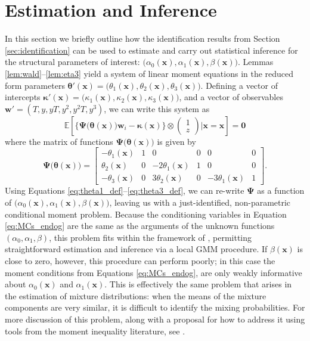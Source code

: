 \section{Estimation and Inference}
\label{sec:inference}
In this section we briefly outline how the identification results from Section \ref{sec:identification} can be used to estimate and carry out statistical inference for the structural parameters of interest: $\big(\alpha_0(\mathbf{x}), \alpha_1(\mathbf{x}), \beta(\mathbf{x})\big)$.
Lemmas \ref{lem:wald}--\ref{lem:eta3} yield a system of linear moment equations in the reduced form parameters $\boldsymbol{\theta}'(\mathbf{x}) = \big(\theta_1(\mathbf{x}), \theta_2(\mathbf{x}),\theta_3(\mathbf{x})\big)$.
Defining a vector of intercepts $\boldsymbol{\kappa}'(\mathbf{x}) = \big(\kappa_1(\mathbf{x}), \kappa_2(\mathbf{x}), \kappa_3(\mathbf{x})\big)$,
and a vector of observables $\mathbf{w}' = (T, y, yT, y^2, y^2 T, y^3)$, we can write this system as
\begin{equation}
\mathbb{E}\left[
  \bigg\{\boldsymbol{\Psi}\big(\boldsymbol{\theta}(\mathbf{x})\big)\mathbf{w}_i - \boldsymbol{\kappa}(\mathbf{x})\bigg\} \otimes 
\left(
\begin{array}{c}
  1 \\ z
\end{array}\right)\Bigg| \mathbf{x} = \boldsymbol{x}
\right] = \mathbf{0}
\label{eq:MCs_endog}
\end{equation}
where the matrix of functions $\boldsymbol{\Psi}\big(\boldsymbol{\theta}(\mathbf{x})\big)$ is given by 
\[
  \boldsymbol{\Psi}\big(\boldsymbol{\theta}(\mathbf{x})\big) = 
  \left[
  \begin{array}{rrrrrr}
    -\theta_1(\mathbf{x}) & 1 & 0 & 0 & 0 & 0\\
    \theta_2(\mathbf{x}) & 0 & -2\theta_1(\mathbf{x}) & 1 & 0 & 0\\ 
    -\theta_3(\mathbf{x}) & 0 & 3\theta_2(\mathbf{x}) & 0 & -3\theta_1(\mathbf{x}) & 1
\end{array}\right].
\]
Using Equations \ref{eq:theta1_def}--\ref{eq:theta3_def}, we can re-write  $\mathbf{\Psi}$ as a function of $\big(\alpha_0(\mathbf{x}), \alpha_1(\mathbf{x}), \beta(\mathbf{x})\big)$, leaving us with a just-identified, non-parametric conditional moment problem.
Because the conditioning variables in Equation \ref{eq:MCs_endog} are the same as the arguments of the unknown functions $(\alpha_0, \alpha_1, \beta)$, this problem fits within the framework of \cite{Lewbel2007}, permitting straightforward estimation and inference via a local GMM procedure. 
If $\beta(\mathbf{x})$ is close to zero, however, this procedure can perform poorly; in this case the moment conditions from Equations \ref{eq:MCs_endog}, are only weakly informative about $\alpha_0(\mathbf{x})$ and $\alpha_1(\mathbf{x})$.
This is effectively the same problem that arises in the estimation of mixture distributions: when the means of the mixture components are very similar, it is difficult to identify the mixing probabilities.  
For more discussion of this problem, along with a proposal for how to address it using tools from the moment inequality literature, see  \cite{DiTragliaGarciaWP2017}.
